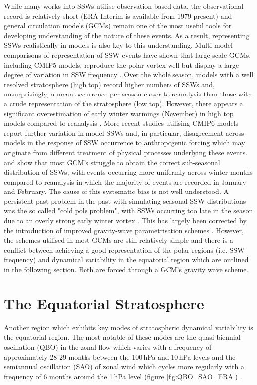 While many works into SSWs utilise observation based data, the observational record is relatively short (ERA-Interim is available from 1979-present) and general circulation models (GCMs) remain one of the most useful tools for developing understanding of the nature of these events. As a result, representing SSWs realistically in models is also key to this understanding. Multi-model comparisons of representation of SSW events have shown that large scale GCMs, including CMIP5 models, reproduce the polar vortex well but display a large degree of variation in SSW frequency \citep{Butchart2011, Kim2017}. Over the whole season, models with a well resolved stratosphere (high top) record higher numbers of SSWs and, unsurprisingly, a mean occurrence per season closer to reanalysis than those with a crude representation of the stratosphere (low top). However, there appears a significant overestimation of early winter warmings (November) in high top models compared to reanalysis \citep{Kim2017}. More recent studies utilising CMIP6 models report further variation in model SSWs and, in particular, disagreement across models in the response of SSW occurrence to anthropogenic forcing \citep{ayarzaguenaUncertainty2020b} which may originate from different treatment of physical processes underlying these events. \cite{Charlton2007} and \cite{Schmidt2013} show that most GCM’s struggle to obtain the correct sub-seasonal distribution of SSWs, with events occurring more uniformly across winter months compared to reanalysis in which the majority of events are recorded in January and February. The cause of this systematic bias is not well understood. A persistent past problem in the past with simulating seasonal SSW distributions was the so called "cold pole problem", with SSWs occurring too late in the season due to an overly strong early winter vortex \citep{pawsonGCM2000, Charlton2007}. This has largely been corrected by the introduction of improved gravity-wave parametrisation schemes \cite{garciaModification2017}. However, the schemes utilised in most GCMs are still relatively simple and there is a conflict between achieving a good representation of the polar regions (i.e. SSW frequency) and dynamical variability in the equatorial region \citep{eichingerEffects2020} which are outlined in the following section. Both are forced through a GCM's gravity wave scheme. 

\section{The Equatorial Stratosphere}\label{sec:equatorial_strat}
Another region which exhibits key modes of stratospheric dynamical variability is the equatorial region. The most notable of these modes are the quasi-biennial oscillation (QBO) in the zonal flow which varies with a frequency of approximately 28-29 months between the 100\,hPa and 10\,hPa levels and the semiannual oscillation (SAO) of zonal wind which cycles more regularly with a frequency of 6 months around the 1\,hPa level (figure \ref{fig:QBO_SAO_ERA}) \citep{Baldwin1991}.

